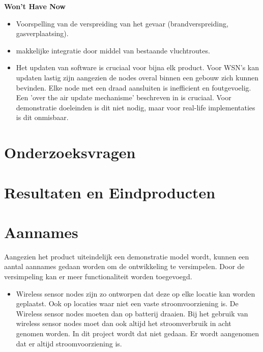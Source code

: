 \documentclass{../local}
\begin{document}
\noindent\textbf{Won't Have Now}
\begin{itemize}
\item Voorspelling van de verspreiding van het gevaar (brandverspreiding, gasverplaatsing).
\item makkelijke integratie door middel van bestaande vluchtroutes.
\item Het updaten van software is cruciaal voor bijna elk product. Voor WSN's kan updaten lastig zijn aangezien de nodes overal binnen een gebouw zich kunnen bevinden. Elke node met een draad aansluiten is inefficient en foutgevoelig. Een 'over the air update mechanisme' beschreven in \cite{StatRUP} is cruciaal. Voor demonstratie doeleinden is dit niet nodig, maar voor real-life implementaties is dit onmisbaar.
\end{itemize}
\section{Onderzoeksvragen}


\section{Resultaten en Eindproducten}


\section{Aannames}
Aangezien het product uiteindelijk een demonstratie model wordt, kunnen een aantal aannames gedaan worden om de ontwikkeling te versimpelen. Door de versimpeling kan er meer functionaliteit worden toegevoegd.

\begin{itemize}
\item Wireless sensor nodes zijn zo ontworpen dat deze op elke locatie kan worden geplaatst. Ook op locaties waar niet een vaste stroomvoorziening is. De Wireless sensor nodes moeten dan op batterij draaien. Bij het gebruik van wireless sensor nodes moet dan ook altijd het stroomverbruik in acht genomen worden. In dit project wordt dat niet gedaan. Er wordt aangenomen dat er altijd stroomvoorziening is.

\end{itemize}
\end{document}
